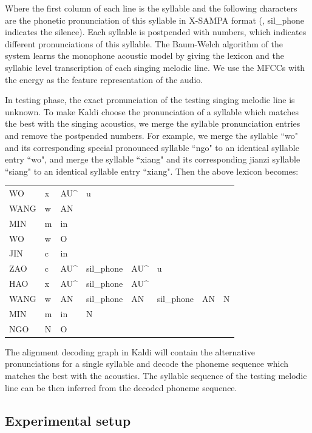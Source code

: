 Where the first column of each line is the syllable and the following characters are the phonetic pronunciation of this syllable in \gls{X-SAMPA} format (, sil\_phone indicates the silence). Each syllable is postpended with numbers, which indicates different pronunciations of this syllable. The Baum-Welch algorithm of the system learns the monophone acoustic model by giving the lexicon and the syllabic level transcription of each singing melodic line. We use the \gls{MFCC}s with the energy as the feature representation of the audio.

In testing phase, the exact pronunciation of the testing singing melodic line is unknown. To make Kaldi choose the pronunciation of a syllable which matches the best with the singing acoustics, we merge the syllable pronunciation entries and remove the postpended numbers. For example, we merge the syllable ``wo" and its corresponding special pronounced syllable ``ngo" to an identical syllable entry ``wo", and merge the syllable ``xiang" and its corresponding \gls{jianzi} syllable ``siang" to an identical syllable entry ``xiang". Then the above lexicon becomes:

\begin{table}[ht!]
\begin{tabular}{llllllll}
WO & x & AU\^ & u & & & & \\
WANG & w & AN & & & & & \\
MIN & m & in & & & & & \\
WO & w & O & & & & & \\
JIN & c & in & & & & & \\
ZAO & c & AU\^ & sil\_phone & AU\^ & u & & \\
HAO & x & AU\^ & sil\_phone & AU\^ & & & \\
WANG & w & AN & sil\_phone & AN & sil\_phone & AN & N \\
MIN & m & in & N & & & & \\
NGO & N & O & & & & &
\end{tabular}
\end{table}

The alignment decoding graph in Kaldi will contain the alternative pronunciations for a single syllable and decode the phoneme sequence which matches the best with the acoustics. The syllable sequence of the testing melodic line can be then inferred from the decoded phoneme sequence.

\subsection{Experimental setup}\label{sec:ch6:experimental_setup_baseline}

